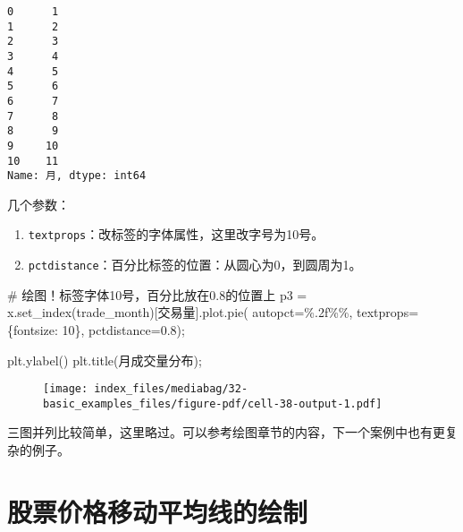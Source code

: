 \documentclass[
  letterpaper,
  DIV=11,
  numbers=noendperiod]{scrreprt}
\newenvironment{Shaded}{\begin{snugshade}}{\end{snugshade}}
\newcommand{\CommentTok}[1]{\textcolor[rgb]{0.37,0.37,0.37}{#1}}
\newcommand{\DecValTok}[1]{\textcolor[rgb]{0.68,0.00,0.00}{#1}}
\newcommand{\FloatTok}[1]{\textcolor[rgb]{0.68,0.00,0.00}{#1}}
\newcommand{\NormalTok}[1]{\textcolor[rgb]{0.00,0.23,0.31}{#1}}
\newcommand{\OperatorTok}[1]{\textcolor[rgb]{0.37,0.37,0.37}{#1}}
\newcommand{\SpecialCharTok}[1]{\textcolor[rgb]{0.37,0.37,0.37}{#1}}
\newcommand{\StringTok}[1]{\textcolor[rgb]{0.13,0.47,0.30}{#1}}
\providecommand{\tightlist}{%
  \setlength{\itemsep}{0pt}\setlength{\parskip}{0pt}}\usepackage{longtable,booktabs,array}
\begin{document}
\begin{verbatim}
0      1
1      2
2      3
3      4
4      5
5      6
6      7
7      8
8      9
9     10
10    11
Name: 月, dtype: int64
\end{verbatim}

几个参数：

\begin{enumerate}
\def\labelenumi{\arabic{enumi}.}
\tightlist
\item
  \texttt{textprops}：改标签的字体属性，这里改字号为10号。
\item
  \texttt{pctdistance}：百分比标签的位置：从圆心为0，到圆周为1。
\end{enumerate}

\begin{Shaded}
\begin{Highlighting}[]
\CommentTok{\# 绘图！标签字体10号，百分比放在0.8的位置上}
\NormalTok{p3 }\OperatorTok{=}\NormalTok{ x.set\_index(trade\_month)[}\StringTok{\textquotesingle{}交易量\textquotesingle{}}\NormalTok{].plot.pie(}
\NormalTok{    autopct}\OperatorTok{=}\StringTok{\textquotesingle{}}\SpecialCharTok{\%.2f\%\%}\StringTok{\textquotesingle{}}\NormalTok{, textprops}\OperatorTok{=}\NormalTok{\{}\StringTok{\textquotesingle{}fontsize\textquotesingle{}}\NormalTok{: }\DecValTok{10}\NormalTok{\}, pctdistance}\OperatorTok{=}\FloatTok{0.8}\NormalTok{)}\OperatorTok{;}

\NormalTok{plt.ylabel(}\StringTok{\textquotesingle{}\textquotesingle{}}\NormalTok{)}
\NormalTok{plt.title(}\StringTok{\textquotesingle{}月成交量分布\textquotesingle{}}\NormalTok{)}\OperatorTok{;}
\end{Highlighting}
\end{Shaded}

\begin{figure}[H]

{\centering \texttt{[image: index\_files/mediabag/32-basic\_examples\_files/figure-pdf/cell-38-output-1.pdf]}

}

\end{figure}

三图并列比较简单，这里略过。可以参考绘图章节的内容，下一个案例中也有更复杂的例子。

\hypertarget{ux80a1ux7968ux4ef7ux683cux79fbux52a8ux5e73ux5747ux7ebfux7684ux7ed8ux5236}{%
\section{股票价格移动平均线的绘制}\label{ux80a1ux7968ux4ef7ux683cux79fbux52a8ux5e73ux5747ux7ebfux7684ux7ed8ux5236}}
\end{document}
